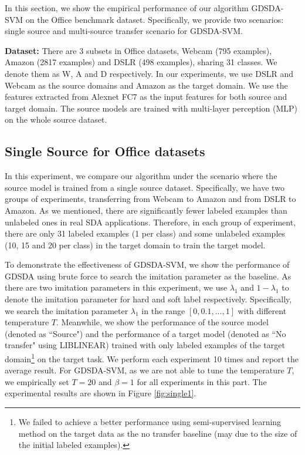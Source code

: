 In this section, we show the empirical performance of our algorithm GDSDA-SVM on the Office benchmark dataset. Specifically, we provide two scenarios: single source and multi-source transfer scenario for GDSDA-SVM.

\textbf{Dataset:}
There are 3 subsets in Office datasets, Webcam (795 examples), Amazon (2817 examples) and DSLR (498 examples), sharing 31 classes. We denote them as W, A and D respectively. In our experiments, we use DSLR and Webcam as the source domains and Amazon as the target domain.
We use the features extracted from Alexnet \cite{KrizhevskyNIPS12} FC7 as the input features for both source and target domain. The source models are trained with multi-layer perception (MLP) on the whole source dataset. 

\subsection{Single Source for Office datasets}
In this experiment, we compare our algorithm under the scenario where the source model is trained from a single source dataset. Specifically, we have two groups of experiments, transferring from Webcam to Amazon and from DSLR to Amazon. As we mentioned, there are significantly fewer labeled examples than unlabeled ones in real SDA applications.
Therefore, in each group of experiment, there are only 31 labeled examples (1 per class) and some unlabeled examples (10, 15 and 20 per class) in the target domain to train the target model.

To demonstrate the effectiveness of GDSDA-SVM, we show the performance of GDSDA using brute force to search the imitation parameter as the baseline. As there are two imitation parameters in this experiment, we use $\lambda_1$ and  $1-\lambda_1$ to denote the imitation parameter for hard and soft label respectively. Specifically, we search the imitation parameter $\lambda_1$ in the range $[0,0.1,...,1]$ with different temperature $T$. Meanwhile, we show the performance of the source model (denoted as ``Source") and the performance of a target model (denoted as ``No transfer" using LIBLINEAR\cite{fan2008liblinear}) trained with only labeled examples of the target domain\footnote{We failed to achieve a better performance using semi-supervised learning method \cite{delalleau2005efficient} on the target data as the no transfer baseline (may due to the size of the initial labeled examples).} on the target task. We perform each experiment 10 times and report the average result. For GDSDA-SVM, as we are not able to tune the temperature $T$, we empirically set $T=20$  and $\beta=1$ for all experiments in this part. The experimental results are shown in Figure \ref{fig:single1}. 

